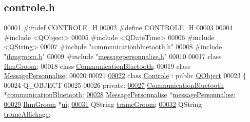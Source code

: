 \hypertarget{controle_8h_source}{}\subsection{controle.\+h}

\begin{DoxyCode}
00001 \textcolor{preprocessor}{#ifndef CONTROLE\_H}
00002 \textcolor{preprocessor}{#define CONTROLE\_H}
00003 
00004 \textcolor{preprocessor}{#include <QObject>}
00005 \textcolor{preprocessor}{#include <QDateTime>}
00006 \textcolor{preprocessor}{#include <QString>}
00007 \textcolor{preprocessor}{#include "\hyperlink{communicationbluetooth_8h}{communicationbluetooth.h}"}
00008 \textcolor{preprocessor}{#include "\hyperlink{ihmgroom_8h}{ihmgroom.h}"}
00009 \textcolor{preprocessor}{#include "\hyperlink{messagepersonnalise_8h}{messagepersonnalise.h}"}
00010 
00017 \textcolor{keyword}{class }\hyperlink{class_ihm_groom}{IhmGroom};
00018 \textcolor{keyword}{class }\hyperlink{class_communication_bluetooth}{CommunicationBluetooth};
00019 \textcolor{keyword}{class }\hyperlink{class_message_personnalise}{MessagePersonnalise};
00020 
00021 
\hyperlink{class_controle}{00022} \textcolor{keyword}{class }\hyperlink{class_controle}{Controle} : \textcolor{keyword}{public} \hyperlink{class_q_object}{QObject}
00023 \{
00024     Q\_OBJECT
00025 
00026     \textcolor{keyword}{private}:
\hyperlink{class_controle_a5d818564000173732472eb9ac20e53aa}{00027}         \hyperlink{class_communication_bluetooth}{CommunicationBluetooth} *\hyperlink{class_controle_a5d818564000173732472eb9ac20e53aa}{communicationBluetooth};     
\hyperlink{class_controle_a6240fc19c937146243bcd950e5408481}{00028}         \hyperlink{class_message_personnalise}{MessagePersonnalise} *\hyperlink{class_controle_a6240fc19c937146243bcd950e5408481}{messagePersonnalise};           
\hyperlink{class_controle_a2dd60c955396dd80426c1a74f56ea611}{00029}         \hyperlink{class_ihm_groom}{IhmGroom} *\hyperlink{class_controle_a2dd60c955396dd80426c1a74f56ea611}{ui};                                       
\hyperlink{class_controle_a5b9512ebbaf16746f55a9519de88f9be}{00031}         QString \hyperlink{class_controle_a5b9512ebbaf16746f55a9519de88f9be}{trameGroom};                                 
\hyperlink{class_controle_a0bbdd7a0c44fbbc45bf3a381872fcfbe}{00032}         QString \hyperlink{class_controle_a0bbdd7a0c44fbbc45bf3a381872fcfbe}{trameAffichage};                             

\end{DoxyCode}
